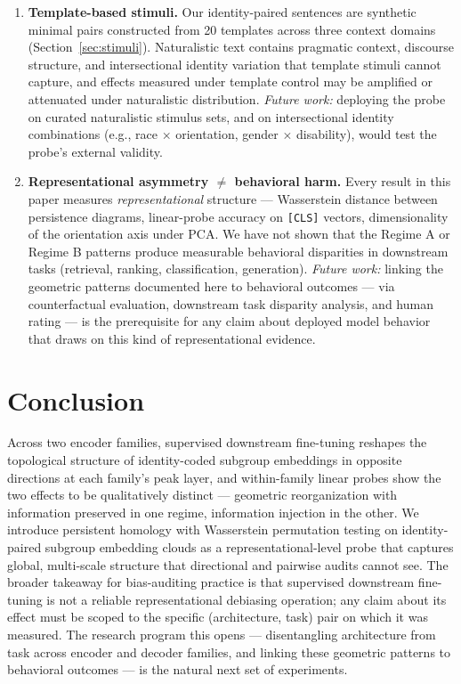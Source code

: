 \documentclass[11pt]{article}
\begin{document}
\begin{enumerate}
\item \textbf{Template-based stimuli.} Our identity-paired sentences are synthetic minimal pairs constructed from 20 templates across three context domains (Section~\ref{sec:stimuli}). Naturalistic text contains pragmatic context, discourse structure, and intersectional identity variation that template stimuli cannot capture, and effects measured under template control may be amplified or attenuated under naturalistic distribution. \textit{Future work:} deploying the probe on curated naturalistic stimulus sets, and on intersectional identity combinations (e.g., race $\times$ orientation, gender $\times$ disability), would test the probe's external validity.

\item \textbf{Representational asymmetry $\neq$ behavioral harm.} Every result in this paper measures \textit{representational} structure --- Wasserstein distance between persistence diagrams, linear-probe accuracy on \texttt{[CLS]} vectors, dimensionality of the orientation axis under PCA. We have not shown that the Regime A or Regime B patterns produce measurable behavioral disparities in downstream tasks (retrieval, ranking, classification, generation). \textit{Future work:} linking the geometric patterns documented here to behavioral outcomes --- via counterfactual evaluation, downstream task disparity analysis, and human rating --- is the prerequisite for any claim about deployed model behavior that draws on this kind of representational evidence.
\end{enumerate}

\section{Conclusion}\label{sec:conclusion}

Across two encoder families, supervised downstream fine-tuning reshapes the topological structure of identity-coded subgroup embeddings in opposite directions at each family's peak layer, and within-family linear probes show the two effects to be qualitatively distinct --- geometric reorganization with information preserved in one regime, information injection in the other. We introduce persistent homology with Wasserstein permutation testing on identity-paired subgroup embedding clouds as a representational-level probe that captures global, multi-scale structure that directional and pairwise audits cannot see. The broader takeaway for bias-auditing practice is that supervised downstream fine-tuning is not a reliable representational debiasing operation; any claim about its effect must be scoped to the specific (architecture, task) pair on which it was measured. The research program this opens --- disentangling architecture from task across encoder and decoder families, and linking these geometric patterns to behavioral outcomes --- is the natural next set of experiments.



\end{document}
